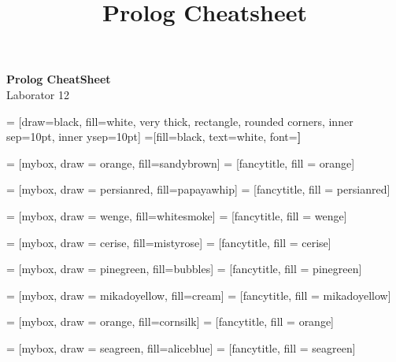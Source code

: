 \documentclass[a3paper]{article}
\title{Prolog Cheatsheet}
\begin{document}
\begin{center}{\huge{\textbf{Prolog CheatSheet}}}\\
{\large Laborator 12}
\end{center}

\begin{multicols*}{3}

 = [draw=black, fill=white, very thick,
    rectangle, rounded corners, inner sep=10pt, inner ysep=10pt]
 =[fill=black, text=white, font=\bfseries]

 = [mybox, draw = orange, fill=sandybrown]
 = [fancytitle, fill = orange]


 = [mybox, draw = persianred, fill=papayawhip]
 = [fancytitle, fill = persianred]

 = [mybox, draw = wenge, fill=whitesmoke]
 = [fancytitle, fill = wenge]

 = [mybox, draw = cerise, fill=mistyrose]
 = [fancytitle, fill = cerise]

 = [mybox, draw = pinegreen, fill=bubbles]
 = [fancytitle, fill = pinegreen]

 = [mybox, draw = mikadoyellow, fill=cream]
 = [fancytitle, fill = mikadoyellow]

 = [mybox, draw = orange, fill=cornsilk]
 = [fancytitle, fill = orange]

 = [mybox, draw = seagreen, fill=aliceblue]
 = [fancytitle, fill = seagreen]


\end{multicols*}
\end{document}
